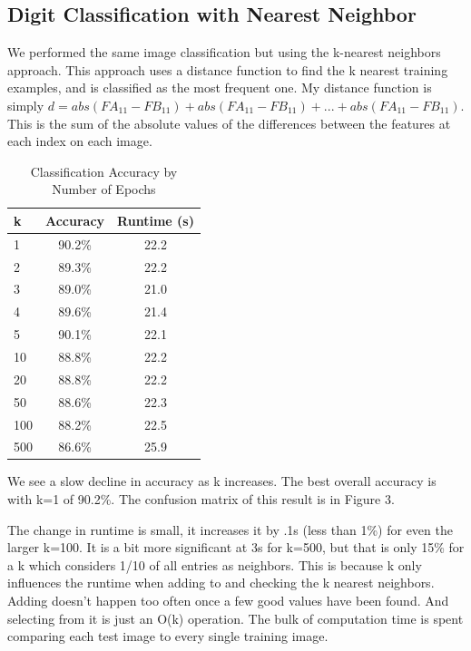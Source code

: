 \documentclass{article}[12pt]
\begin{document}
   \newpage
   
   \subsection{Digit Classification with Nearest Neighbor}
   
   We performed the same image classification but using the k-nearest neighbors approach. This approach uses a distance function to find the k nearest training examples, and is classified as the most frequent one. My distance function is simply $d=abs(FA_{11} - FB_{11}) + abs(FA_{11} - FB_{11}) + ... + abs(FA_{11} - FB_{11})$. This is the sum of the absolute values of the differences between the features at each  index on each image.
   
   \begin{table}[ht]
   	\centering
   	\begin{tabular}{l | c | c}
   		\hline
   		k  & Accuracy & Runtime (s)\\
   		\hline \hline \hline
   		1 & 90.2\% & 22.2\\
   		2 & 89.3\% & 22.2\\
   		3 & 89.0\% & 21.0\\
   		4 & 89.6\% &21.4\\
   		5 & 90.1\% & 22.1\\
   		10 & 88.8\% & 22.2\\
   		20 & 88.8\% & 22.2\\
   		50 & 88.6\% & 22.3\\
   		100 & 88.2\% &22.5\\
   		500 & 86.6\% & 25.9\\
   		\hline
   	\end{tabular}
   	\caption{Classification Accuracy by Number of Epochs} \label{tab:digack}
   \end{table}
   
   We see a slow decline in accuracy as k increases. The best overall accuracy is with k=1 of 90.2\%. The confusion matrix of this result is in Figure 3.
   
   The change in runtime is small, it increases it by .1s (less than 1\%) for even the larger k=100. It is a bit more significant at 3s for k=500, but that is only 15\% for a k which considers 1/10 of all entries as neighbors.  This is because k only influences the runtime when adding to and checking the k nearest neighbors. Adding doesn't happen too often once a few good values have been found. And selecting from it is just an O(k) operation. The bulk of computation time is spent comparing each test image to every single training image.
   
\end{document}
